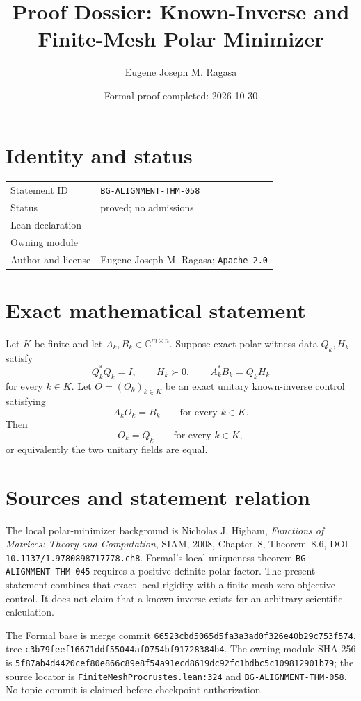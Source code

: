 \documentclass[10pt]{article}
\title{Proof Dossier: Known-Inverse and Finite-Mesh Polar Minimizer}
\author{Eugene Joseph M. Ragasa}
\date{Formal proof completed: 2026-10-30}
\begin{document}
\raggedright
\maketitle

\section{Identity and status}
\begin{tabularx}{\textwidth}{@{}lY@{}}
\toprule
Statement ID & \texttt{BG-ALIGNMENT-THM-058} \\
Status & proved; no admissions \\
Lean declaration &  \\
Owning module &  \\
Author and license & Eugene Joseph M. Ragasa; \texttt{Apache-2.0} \\
\bottomrule
\end{tabularx}

\section{Exact mathematical statement}
Let $K$ be finite and let $A_k,B_k\in\mathbb C^{m\times n}$. Suppose exact polar-witness data
$Q_k,H_k$ satisfy
\[
  Q_k^*Q_k=I,\qquad H_k\succ0,\qquad A_k^*B_k=Q_kH_k
\]
for every $k\in K$. Let $O=(O_k)_{k\in K}$ be an exact unitary known-inverse control satisfying
\[
  A_kO_k=B_k\qquad\text{for every }k\in K.
\]
Then
\[
  O_k=Q_k\qquad\text{for every }k\in K,
\]
or equivalently the two unitary fields are equal.

\section{Sources and statement relation}
The local polar-minimizer background is Nicholas J. Higham, \emph{Functions of Matrices: Theory
and Computation}, SIAM, 2008, Chapter~8, Theorem~8.6, DOI
\texttt{10.1137/1.9780898717778.ch8}. Formal's local uniqueness theorem
\texttt{BG-ALIGNMENT-THM-045} requires a positive-definite polar factor. The present statement
combines that exact local rigidity with a finite-mesh zero-objective control. It does not claim
that a known inverse exists for an arbitrary scientific calculation.

The Formal base is merge commit \texttt{66523cbd5065d5fa3a3ad0f326e40b29c753f574}, tree
\texttt{c3b79feef16671ddf55044af0754bf91728384b4}. The owning-module SHA-256 is
\texttt{5f87ab4d4420cef80e866c89e8f54a91ecd8619dc92fc1bdbc5c109812901b79}; the source locator is
\texttt{FiniteMeshProcrustes.lean:324} and \texttt{BG-ALIGNMENT-THM-058}. No topic commit is
claimed before checkpoint authorization.
\end{document}
